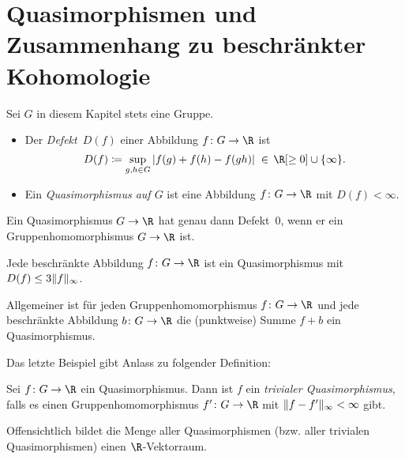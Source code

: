 \chapter{Quasimorphismen und Zusammenhang zu beschränkter Kohomologie}
\begin{thSetup}
    Sei $G$ in diesem Kapitel stets eine Gruppe.
\end{thSetup}

\begin{thDef} \hfill
    \begin{itemize}
        \item
            Der \emph{Defekt~$D(f)$} einer Abbildung $f\colon G\to\R$
            ist
            \[ D(f) \defeq \sup_{g,h\in G}\, \abs{f(g) + f(h) - f(gh)}
                \;\in\, \R[\geq0] \cup \{\infty\}
            . \]
            
        \item
            Ein \emph{Quasimorphismus auf $G$} ist eine
            Abbildung $f\colon G\to\R$ mit $D(f) < \infty$.
    \end{itemize}
\end{thDef}

\begin{BspList}
\item
    Ein Quasimorphismus $G\to\R$ hat genau dann Defekt~$0$, wenn er ein
    Gruppenhomomorphismus $G\to\R$ ist.

\item
    Jede beschränkte Abbildung $f\colon G\to\R$ ist ein
    Quasimorphismus mit $D(f) \leq 3\lVert f\rVert_\infty$.

\item
    Allgemeiner ist für jeden Gruppenhomomorphismus $f\colon G\to\R$ und
    jede beschränkte Abbildung $b\colon G\to\R$ die (punktweise) Summe $f+b$
    ein Quasimorphismus.
\end{BspList}

Das letzte Beispiel gibt Anlass zu folgender Definition:

\begin{thDef}
    Sei $f\colon G\to\R$ ein Quasimorphismus. Dann ist $f$ ein \emph{trivialer
    Quasimorphismus}, falls es einen Gruppenhomomorphismus $f'\colon G\to\R$
    mit $\lVert f-f'\rVert_\infty < \infty$ gibt.
\end{thDef}

Offensichtlich bildet die Menge aller Quasimorphismen (bzw. aller trivialen
Quasimorphismen) einen $\R$-Vektorraum.

